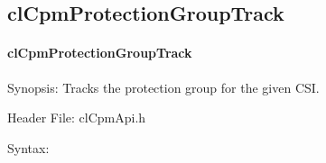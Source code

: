 {\subsection{clCpmProtectionGroupTrack}
\hypertarget{pagecpm123}{}\paragraph{cl\-Cpm\-Protection\-Group\-Track}\label{pagecpm123}
\begin{Desc}
\item[Synopsis:]Tracks the protection group for the given CSI.\end{Desc}
\begin{Desc}
\item[Header File:]clCpmApi.h\end{Desc}
\begin{Desc}
\item[Syntax:]


\end{Desc}}
